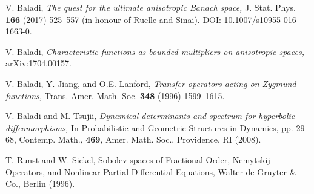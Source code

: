 \documentclass[10pt,twoside]{amsart}
\begin{document}
 \begin{thebibliography}{BT1}
 

  V. Baladi, {\it The quest for the ultimate anisotropic Banach space,} J. Stat. Phys.  
\textbf{166} (2017) 525--557 (in honour of Ruelle and Sinai). DOI: 10.1007/s10955-016-1663-0.


 V. Baladi, \emph{Characteristic functions as bounded multipliers on anisotropic spaces,}
arXiv:1704.00157.



 V. Baladi, Y. Jiang, and O.E. Lanford,
{\it Transfer operators acting on Zygmund functions,}
Trans. Amer. Math. Soc. {\bf 348} (1996) 1599--1615.





V. Baladi and M.  Tsujii,  {\it Dynamical determinants and spectrum for hyperbolic diffeomorphisms,}
In 
Probabilistic and Geometric Structures in Dynamics, pp. 29--68,
Contemp. Math., \textbf{469}, Amer. Math. Soc.,  Providence, RI (2008).

 

 T. Runst and W.  Sickel, 
Sobolev spaces of Fractional Order, Nemytskij
Operators, and Nonlinear Partial Differential Equations,
Walter de Gruyter \& Co., Berlin (1996).




 \end{thebibliography}
\end{document}
